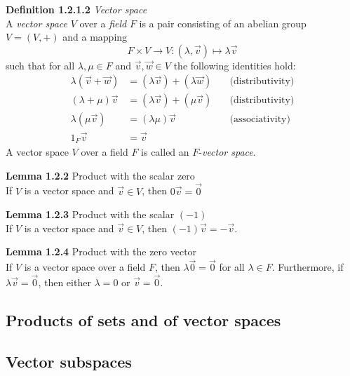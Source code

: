 \documentclass[8pt,landscape]{article}
\begin{document}
\begin{multicols}{3}
    \textbf{Definition 1.2.1.2} \emph{Vector space} \\
    A \emph{vector space} $V$ over a \emph{field} $F$
    is a pair consisting of an abelian group $V = (V,+)$ and a mapping
    \[
        F \times V \to V : (\lambda, \vec{v}) \mapsto \lambda \vec{v}
    \]
    such that for all $\lambda, \mu \in F$ and $\vec{v}, \vec{w} \in V$
    the following identities hold:
    \begin{align*}{}
        \lambda(\vec{v} + \vec{w}) & = (\lambda \vec{v}) + (\lambda \vec{w})
        \quad                            & \text{(distributivity)} \\
        (\lambda + \mu) \vec{v}       & = (\lambda \vec{v}) + (\mu \vec{v})
        \quad                            & \text{(distributivity)} \\
        \lambda(\mu \vec{v})          & = (\lambda \mu) \vec{v}
        \quad                            & \text{(associativity)} \\
        1_F\vec{v}                    & = \vec{v}
    \end{align*}
    A vector space $V$ over a field $F$ is called an $F$-\emph{vector space}.

    \textbf{Lemma 1.2.2} Product with the scalar zero \\
    If $V$ is a vector space and $\vec{v} \in V$, then $0\vec{v} = \vec{0}$

    \textbf{Lemma 1.2.3} Product with the scalar $(-1)$ \\
    If $V$ is a vector space and $\vec{v} \in V$, then $(-1)\vec{v} = -\vec{v}$.

    \textbf{Lemma 1.2.4} Product with the zero vector \\
    If $V$ is a vector space over a field $F$, then $\lambda\vec{0} = \vec{0}$
    for all $\lambda \in F$.
    Furthermore, if $\lambda \vec{v} = \vec{0}$,
    then either $\lambda = 0$ or $\vec{v} = \vec{0}$.

    \subsection{Products of sets and of vector spaces}

    \subsection{Vector subspaces}


\end{multicols}
\end{document}

